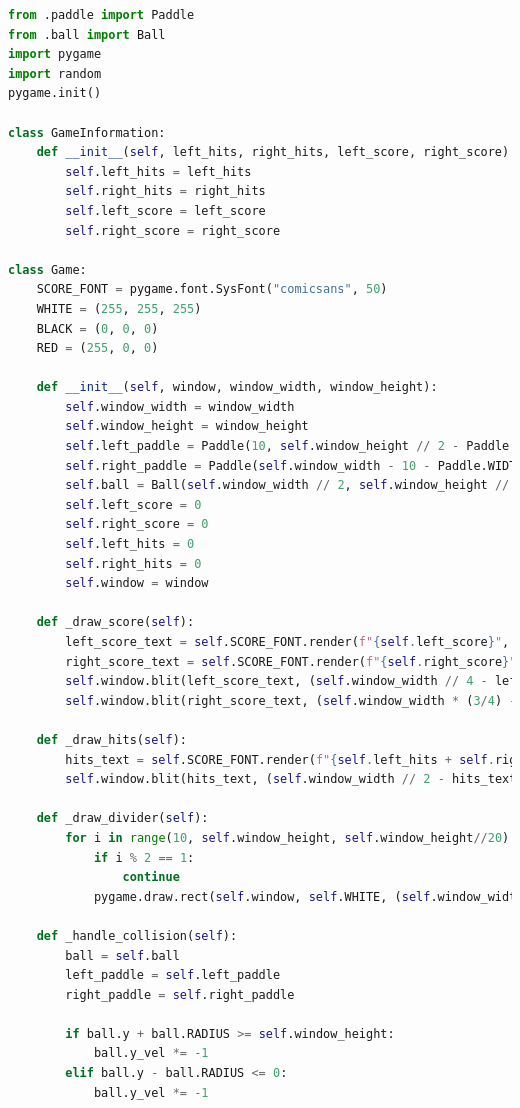 \documentclass[10pt]{article}
\begin{document}
\begin{lstlisting}[language=Python, caption=game.py code]
from .paddle import Paddle
from .ball import Ball
import pygame
import random
pygame.init()

class GameInformation:
    def __init__(self, left_hits, right_hits, left_score, right_score):
        self.left_hits = left_hits
        self.right_hits = right_hits
        self.left_score = left_score
        self.right_score = right_score

class Game:
    SCORE_FONT = pygame.font.SysFont("comicsans", 50)
    WHITE = (255, 255, 255)
    BLACK = (0, 0, 0)
    RED = (255, 0, 0)

    def __init__(self, window, window_width, window_height):
        self.window_width = window_width
        self.window_height = window_height
        self.left_paddle = Paddle(10, self.window_height // 2 - Paddle.HEIGHT // 2)
        self.right_paddle = Paddle(self.window_width - 10 - Paddle.WIDTH, self.window_height // 2 - Paddle.HEIGHT//2)
        self.ball = Ball(self.window_width // 2, self.window_height // 2)
        self.left_score = 0
        self.right_score = 0
        self.left_hits = 0
        self.right_hits = 0
        self.window = window

    def _draw_score(self):
        left_score_text = self.SCORE_FONT.render(f"{self.left_score}", 1, self.WHITE)
        right_score_text = self.SCORE_FONT.render(f"{self.right_score}", 1, self.WHITE)
        self.window.blit(left_score_text, (self.window_width // 4 - left_score_text.get_width()//2, 20))
        self.window.blit(right_score_text, (self.window_width * (3/4) - right_score_text.get_width()//2, 20))

    def _draw_hits(self):
        hits_text = self.SCORE_FONT.render(f"{self.left_hits + self.right_hits}", 1, self.RED)
        self.window.blit(hits_text, (self.window_width // 2 - hits_text.get_width()//2, 10))

    def _draw_divider(self):
        for i in range(10, self.window_height, self.window_height//20):
            if i % 2 == 1:
                continue
            pygame.draw.rect(self.window, self.WHITE, (self.window_width//2 - 5, i, 10, self.window_height//20))

    def _handle_collision(self):
        ball = self.ball
        left_paddle = self.left_paddle
        right_paddle = self.right_paddle

        if ball.y + ball.RADIUS >= self.window_height:
            ball.y_vel *= -1
        elif ball.y - ball.RADIUS <= 0:
            ball.y_vel *= -1


\end{lstlisting}
\end{document}
